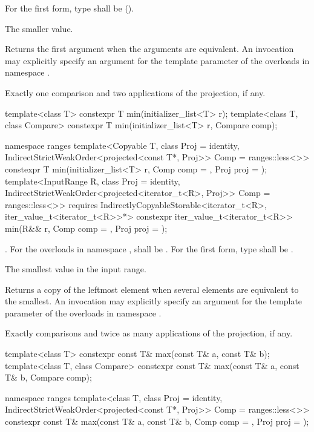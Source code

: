 \begin{itemdescr}
\pnum
\requires
For the first form, type  shall be
 ().

\pnum
\returns
The smaller value.

\pnum
\remarks
Returns the first argument when the arguments are equivalent.
An invocation may explicitly specify an argument
for the template parameter 
of the overloads in namespace .

\pnum
\complexity
Exactly one comparison and two applications of the projection, if any.
\end{itemdescr}

%
\begin{itemdecl}
template<class T>
  constexpr T min(initializer_list<T> r);
template<class T, class Compare>
  constexpr T min(initializer_list<T> r, Compare comp);

namespace ranges {
  template<Copyable T, class Proj = identity,
      IndirectStrictWeakOrder<projected<const T*, Proj>> Comp = ranges::less<>>
    constexpr T min(initializer_list<T> r, Comp comp = {}, Proj proj = {});
  template<InputRange R, class Proj = identity,
      IndirectStrictWeakOrder<projected<iterator_t<R>, Proj>> Comp = ranges::less<>>
    requires IndirectlyCopyableStorable<iterator_t<R>, iter_value_t<iterator_t<R>>*>
    constexpr iter_value_t<iterator_t<R>>
      min(R&& r, Comp comp = {}, Proj proj = {});
}
\end{itemdecl}

\begin{itemdescr}
\pnum
\requires
{}.
For the overloads in namespace ,
 shall be .
For the first form, type  shall be .

\pnum
\returns The smallest value in the input range.

\pnum
\remarks Returns a copy of the leftmost element when several elements are equivalent to the smallest.
An invocation may explicitly specify an argument
for the template parameter 
of the overloads in namespace .

\pnum
\complexity
Exactly  comparisons
and twice as many applications of the projection, if any.
\end{itemdescr}

%
\begin{itemdecl}
template<class T> constexpr const T& max(const T& a, const T& b);
template<class T, class Compare>
  constexpr const T& max(const T& a, const T& b, Compare comp);

namespace ranges {
  template<class T, class Proj = identity,
      IndirectStrictWeakOrder<projected<const T*, Proj>> Comp = ranges::less<>>
    constexpr const T& max(const T& a, const T& b, Comp comp = {}, Proj proj = {});
}
\end{itemdecl}

